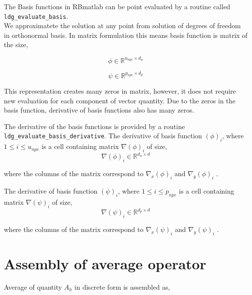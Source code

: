\documentclass[a4paper]{book}
\begin{document}
The Basis functions in RBmatlab can be point evaluated by a routine called \verb|ldg_evaluate_basis|.\\

We approximatete the solution at any point from solution of degrees of freedom in orthonormal basis. In matrix formulation this means basis function is matrix of the size,

\begin{equation}\label{basis_func_velocity_rbmatlab}
\phi \in \mathbb{R}^{u_{npe} \times d_u}
\end{equation}

\begin{equation}\label{basis_func_pressure_rbmatlab}
\psi \in \mathbb{R}^{p_{npe} \times d_p}
\end{equation}

This representation creates many zeros in matrix, however, it does not require new evaluation for each component of vector quantity. Due to the zeros in the basis function, derivative of basis functions also has many zeros.

The derivative of the basis functions is provided by a routine \linebreak \verb|ldg_evaluate_basis_derivative|. The derivative of basis function $(\phi)_{i}$, where $1 \leq i \leq u_{npe}$ is a cell containing matrix $\nabla (\phi)_{i}$ of size,
\begin{equation}\label{basis_func_derivative_velocity_rbmatlab}
\nabla (\phi)_{i} \in \mathbb{R}^{{d_u} \times d}
\end{equation}

where the columns of the matrix correspond to $\nabla_x (\phi)_{i}$ and $\nabla_y (\phi)_{i}$ .

The derivative of basis function $(\psi)_{i}$, where $1 \leq i \leq p_{npe}$ is a cell containing matrix $\nabla (\psi)_{i}$ of size,
\begin{equation}\label{basis_func_derivative_pressure_rbmatlab}
\nabla (\psi)_{i} \in \mathbb{R}^{{d_p} \times d}
\end{equation}

where the columns of the matrix correspond to $\nabla_x (\psi)_{i}$ and $\nabla_y (\psi)_{i}$ .

\section{Assembly of average operator}

Average of quantity $A_h$ in discrete form is assembled as,
\end{document}
